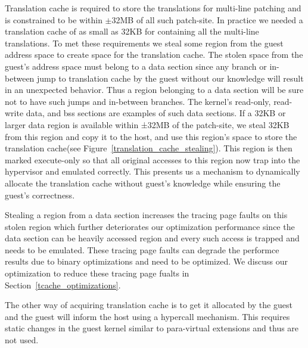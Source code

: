 Translation cache is required to store the translations for multi-line patching and is constrained to be within $\pm$32MB of all such patch-site. In practice we needed a translation cache of as small as 32KB for containing all the multi-line translations. To met these requirements we steal some region from the guest address space to create space for the translation cache. The stolen space from the guest's address space must belong to a data section since any branch or in-between jump to translation cache by the guest without our knowledge will result in an unexpected behavior. Thus a region belonging to a data section will be sure not to have such jumps and in-between branches. The kernel’s read-only, read-write data, and bss sections are examples of such data sections. If a 32KB or larger data region is available within ±32MB of the patch-site, we steal 32KB from this region and copy it to the host, and use this region’s space to store the translation cache(see Figure~\ref{translation_cache_stealing}). This region is then marked execute-only so that all original accesses to this region now trap into the hypervisor and emulated correctly. This presents us a mechanism to dynamically allocate the translation cache without guest's knowledge while ensuring the guest's correctness.

Stealing a region from a data section increases the tracing page faults on this stolen region which further deteriorates our optimization performance since the data section can be heavily accessed region and every such access is trapped and needs to be emulated. These tracing page faults can degrade the performce results due to binary optimizations and need to be optimized. We discuss our optimization to reduce these tracing page fualts in Section~\ref{tcache_optimizations}. 

The other way of acquiring translation cache is to get it allocated by the guest and the guest will inform the host using a hypercall mechanism. This requires static changes in the guest kernel similar to para-virtual extensions and thus are not used.

